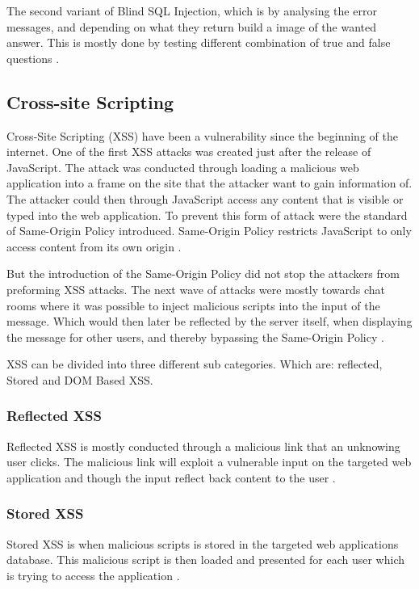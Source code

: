 The second variant of Blind SQL Injection, which is by analysing the error messages, and depending on what they return build a image of the wanted answer. This is mostly done by testing different combination of true and false questions \parencite{JustinClarke-Salt2009SIAa, Secure_Web}.


\subsection{Cross-site Scripting}
Cross-Site Scripting (XSS) have been a vulnerability since the beginning of the internet. One of the first XSS attacks was created just after the release of JavaScript. The attack was conducted through loading a malicious web application into a frame on the site that the attacker want to gain information of. The attacker could then through JavaScript access any content that is visible or typed into the web application. To prevent this form of attack were the standard of Same-Origin Policy introduced. Same-Origin Policy restricts JavaScript to only access content from its own origin \parencite{FogieSeth2007Xacs, w3csop}.

But the introduction of the Same-Origin Policy did not stop the attackers from preforming XSS attacks. The next wave of attacks were mostly towards chat rooms where it was possible to inject malicious scripts into the input of the message. Which would then later be reflected by the server itself, when displaying the message for other users, and thereby bypassing the Same-Origin Policy \parencite{FogieSeth2007Xacs}.

XSS can be divided into three different sub categories. Which are: reflected, Stored and DOM Based XSS.

\subsubsection{Reflected XSS}
Reflected XSS is mostly conducted through a malicious link that an unknowing user clicks. The malicious link will exploit a vulnerable input on the targeted web application and though the input reflect back content to the user \parencite{Secure_Web}.


\subsubsection{Stored XSS}
Stored XSS is when malicious scripts is stored in the targeted web applications database. This malicious script is then loaded and presented for each user which is trying to access the application \parencite{Secure_Web}.


